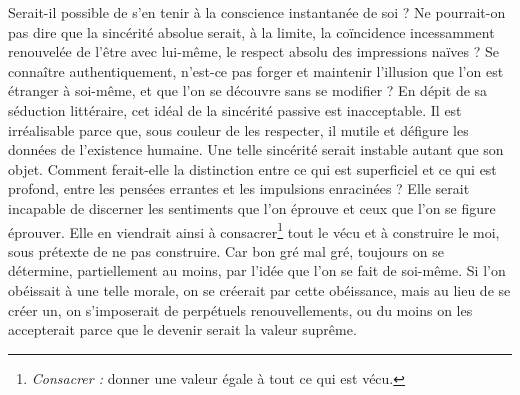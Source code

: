 	{Serait-il possible de s’en tenir à la conscience instantanée de soi ? Ne pourrait-on pas dire que la sincérité absolue serait, à la limite, la coïncidence incessamment renouvelée de l’être avec lui-même, le respect absolu des impressions naïves ? Se connaître authentiquement, n’est-ce pas forger et maintenir l’illusion que l’on est étranger à soi-même, et que l’on se découvre sans se modifier ? En dépit de sa séduction littéraire, cet idéal de la sincérité passive est inacceptable. Il est irréalisable parce que, sous couleur de les respecter, il mutile et défigure les données de l’existence humaine. Une telle sincérité serait instable autant que son objet. Comment ferait-elle la distinction entre ce qui est superficiel et ce qui est profond, entre les pensées errantes et les impulsions enracinées ? Elle serait incapable de discerner les sentiments que l’on éprouve et ceux que l’on se figure éprouver. Elle en viendrait ainsi à consacrer\footnote{\emph{Consacrer :} donner une valeur égale à tout ce qui est vécu.} tout le vécu et à construire le moi, sous prétexte de ne pas construire. Car bon gré mal gré, toujours on se détermine, partiellement au moins, par l’idée que l’on se fait de soi-même. Si l’on obéissait à une telle morale, on se créerait par cette obéissance, mais au lieu de se créer un, on s’imposerait de perpétuels renouvellements, ou du moins on les accepterait parce que le devenir serait la valeur suprême.
	}


